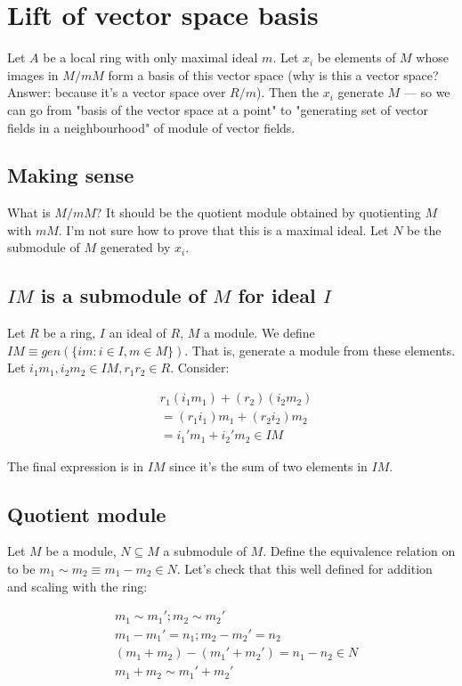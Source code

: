 \documentclass{book}
\begin{document}
\section{Lift of vector space basis}

Let $A$ be a local ring with only maximal ideal $m$.
Let $x_i$ be elements of $M$ whose images in $M/mM$ form a basis of this vector
space (why is this a vector space? Answer: because it's a vector space over $R/m$). 
Then the $x_i$ generate $M$ --- so we can go from "basis of the vector space at
a point" to "generating set of vector fields in a neighbourhood" of module of
vector fields.

\subsection{Making sense}

What is $M/mM$? It should be the quotient module obtained by quotienting $M$ with $mM$. I'm not sure how to prove that
this is a maximal ideal.
Let $N$ be the submodule of $M$ generated by $x_i$.

\subsection{$IM$ is a submodule of $M$ for ideal $I$}

Let $R$ be a ring, $I$ an ideal of $R$, $M$ a module. We define $IM \equiv gen(\{ im : i \in I, m \in M \})$.
That is, generate a module from these elements.
Let $i_1 m_1, i_2 m_2 \in IM, r_1 r_2 \in R$. Consider:

\begin{align*}
& r_1 (i_1 m_1) + (r_2) (i_2 m_2) \\
& = (r_1 i_1) m_1 + (r_2 i_2) m_2 \\
&=  i_1' m_1 + i_2' m_2 \in IM
\end{align*}

The final expression is in $IM$ since it's the sum of two elements in $IM$.

\subsection{Quotient module}

Let $M$ be a module, $N \subseteq M$ a submodule of $M$. Define the equivalence relation on
to be  $m_1 \sim m_2 \equiv m_1 - m_2 \in N$. Let's check that this well defined for addition and scaling with the ring:

\begin{align*}
&m_1 \sim m_1'; m_2 \sim m_2' \\
&m_1 - m_1' = n_1 ; m_2 - m_2' = n_2 \\
&(m_1 + m_2) - (m_1' + m_2') = n_1 - n_2 \in N \\
&m_1 + m_2 \sim m_1' + m_2' \\
\end{align*}
\end{document}

